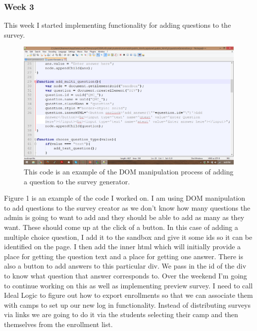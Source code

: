 \documentclass[letterpaper,10pt,serif, draftclsnofoot,onecolumn, compsoc, titlepage]{IEEEtran}
\begin{document}
\subsubsection{Week 3}
This week I started implementing functionality for adding questions to the survey.
\begin{figure}
\includegraphics[scale=.5, width=\textwidth]{code_snippet_1.png}
\caption{This code is an example of the DOM manipulation process of adding a question to the survey generator.}
\label{fig:code1}
\end{figure}
Figure 1 is an example of the code I worked on. I am using DOM manipulation to add questions to the survey creator as we
don't know how many questions the admin is going to want to add and they should be able to add as many as they want. These 
should come up at the click of a button. In this case of adding a multiple choice question, I add it to the sandbox and give it some
ids so it can be identified on the page. I then add the inner html which will initially provide a place for getting the question text 
and a place for getting one answer. There is also a button to add answers to this particular div. We pass in the id of the div to 
know what question that answer corresponds to. 
Over the weekend I'm going to continue working on this as well as implementing preview survey.
I need to call Ideal Logic to figure out how to export enrollments so that we can associate them with camps to set up our new log in
functionality. Instead of distributing surveys via links we are going to do it via the students selecting their camp and then themselves from the enrollment list. 
\end{document}
